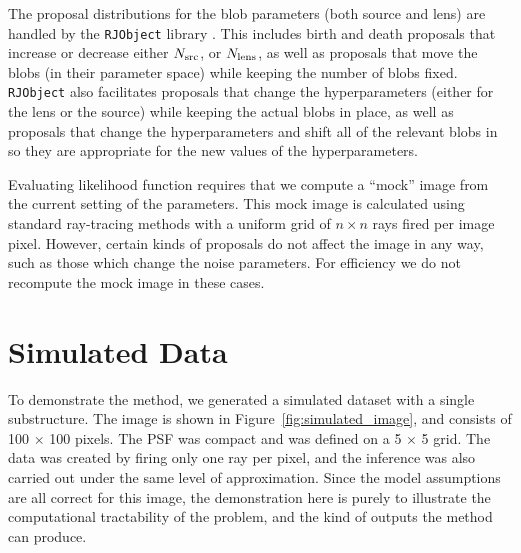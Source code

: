 \documentclass[useAMS,usenatbib]{mn2e}
\begin{document}
The proposal distributions for the blob parameters (both source and lens) are
handled by the {\tt RJObject} library \citep{rjobject}. This includes
birth and death proposals that increase or decrease either $N_{\rm src}$,
or $N_{\rm lens}$, as well as proposals that move the blobs (in their parameter
space) while keeping the number of blobs fixed. {\tt RJObject} also
facilitates proposals that change the hyperparameters (either for the lens
or the source) while keeping the actual blobs in place, as well as proposals
that change the hyperparameters and shift all of the relevant blobs in
so they are appropriate for the new values of the hyperparameters.

Evaluating likelihood function requires that we compute a ``mock'' image from
the current setting of the parameters. This mock image is calculated using
standard ray-tracing methods with a uniform grid of $n \times n$ rays
fired per image pixel. However, certain kinds of proposals do not affect the
image in any way, such as those which change the noise parameters. For efficiency
we do not recompute the mock image in these cases.

\section{Simulated Data}
To demonstrate the method, we generated a simulated dataset with a single
substructure. The image is shown in Figure~\ref{fig:simulated_image}, and
consists of 100 $\times$ 100 pixels. The PSF was compact and was
defined on a 5 $\times$ 5 grid. The data was created by firing only one ray
per pixel, and the inference was also carried out under the same level of
approximation. Since the model assumptions are all correct for this image, the
demonstration here is purely to illustrate the computational tractability of
the problem, and the kind of outputs the method can produce.
\end{document}
